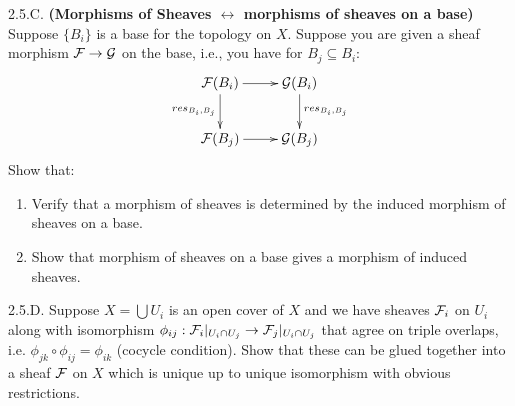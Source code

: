 \begin{exercise}{2.5.C.}
    { \textbf{(Morphisms of Sheaves $\leftrightarrow$ morphisms of sheaves on a base)}} \\
    Suppose $\{B_i\}$ is a base for the topology on $X$. Suppose you are given a sheaf morphism $\mathcal{F} \to \mathcal{G}$ on the base, i.e., you have for $B_j \subseteq B_i$: 
    \[ 
        \xymatrix{ \FF(B_i) \ar[r] \ar[d]_{res_{B_i, B_j}} &\GG(B_i) \ar[d]^{res_{B_i, B_j}} \\ 
        \FF(B_j) \ar[r] &\GG(B_j)}
    \]
    Show that: 
    \begin{enumerate}[topsep=1pt, itemsep=1pt]
        \item Verify that a morphism of sheaves is determined by the induced morphism of sheaves on a base. 
        \item Show that morphism of sheaves on a base gives a morphism of induced sheaves. 
    \end{enumerate}
\end{exercise}
\begin{solution}
    \todo{}

\end{solution}

\begin{exercise}{2.5.D.} 
    Suppose $X = \bigcup U_i$ is an open cover of $X$ and we have sheaves $\mathcal{F}_i$ on $U_i$ along with isomorphism $\phi_{ij}: \mathcal{F}_i|_{U_i \cap U_j} \to \mathcal{F}_j|_{U_i \cap U_j}$ that agree on triple overlaps, i.e. $\phi_{jk} \circ \phi_{ij} = \phi_{ik}$ (cocycle condition). Show that these can be glued together into a sheaf $\mathcal{F}$ on $X$ which is unique up to unique isomorphism with obvious restrictions. 
\end{exercise}
\begin{solution}
    \todo{}
\end{solution}
